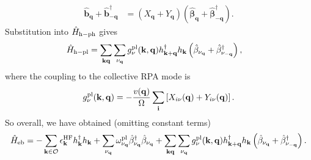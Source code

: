 \begin{align}
    \hat{\mathbf b}_{\mathbf q}
    +
    \hat{\mathbf b}_{-\mathbf q}^{\dagger}
    &=
    \left(
        X_{\mathbf q}
        +
        Y_{\mathbf q}
    \right)
    \left(
        \hat{\boldsymbol{\beta}}_{\mathbf q}
        +
        \hat{\boldsymbol{\beta}}_{-\mathbf q}^{\dagger}
    \right).
    \label{eq:x_plus_y_origin}
\end{align}
Substitution into $\hat H_{\rm h-ph}$ gives
\begin{align}
    \hat H_{\rm h-pl}
    &=
    \sum_{\mathbf k\mathbf q}
    \sum_{\nu_{\mathbf q}}
    g_{\nu}^{\rm pl}(\mathbf k,\mathbf q)
    h_{\mathbf k+\mathbf q}^{\dagger}
    h_{\mathbf k}
    \left(
        \hat\beta_{\nu_{\mathbf q}}
        +
        \hat\beta_{\nu_{-\mathbf q}}^{\dagger}
    \right),
    \label{eq:hole_plasmon_coupling}
\end{align}
where the coupling to the collective RPA mode is
\begin{equation}
    {
    g_{\nu}^{\rm pl}(\mathbf k,\mathbf q)
    =
    -\frac{v(\mathbf q)}{\Omega}
    \sum_{\mathbf i}
    \left[
        X_{i\nu}(\mathbf q)
        +
        Y_{i\nu}(\mathbf q)
    \right].
    }
    \label{eq:screened_hole_plasmon_coupling}
\end{equation}
So overall, we have obtained (omitting constant terms)
\begin{equation}
    \hat H_{\rm eb}
    =
    -\sum_{\mathbf k\in\mathcal O}
    \epsilon_{\mathbf k}^{\rm HF}
    h_{\mathbf k}^{\dagger}h_{\mathbf k}
    +
    \sum_{\nu_{\mathbf q}}
    \omega_{\nu_{\mathbf q}}^{\rm pl}
    \hat\beta_{\nu_{\mathbf q}}^{\dagger}
    \hat\beta_{\nu_{\mathbf q}}
    +
    \sum_{\mathbf k\mathbf q}
    \sum_{\nu_{\mathbf q}}
    g_{\nu}^{\rm pl}(\mathbf k,\mathbf q)
    h_{\mathbf k+\mathbf q}^{\dagger}
    h_{\mathbf k}
    \left(
        \hat\beta_{\nu_{\mathbf q}}
        +
        \hat\beta_{\nu_{-\mathbf q}}^{\dagger}
    \right).
\end{equation}

